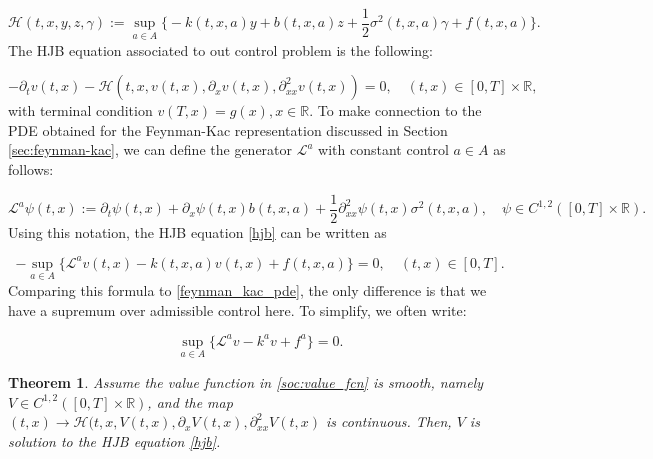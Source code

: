 \documentclass{article}
\newtheorem{theorem}{Theorem}
\begin{document}
\begin{equation}
\mathcal{H}(t,x,y,z,\gamma):=\sup_{a\in A}\Big\{-k(t,x,a)y+b(t,x,a)z+\frac{1}{2}\sigma^2(t,x,a)\gamma+f(t,x,a)\Big\}.
\end{equation}
The HJB equation associated to out control problem is the following:

\begin{equation} \label{hjb}
-\partial_tv(t,x)-\mathcal{H}(t,x,v(t,x),\partial_xv(t,x),\partial^2_{xx}v(t,x))=0, \quad (t,x)\in[0,T]\times\mathbb{R},
\end{equation}
with terminal condition $v(T,x)=g(x),x\in\mathbb{R}$. To make connection to the PDE obtained for the Feynman-Kac representation discussed in Section \ref{sec:feynman-kac}, we can define the generator $\mathcal{L}^a$ with constant control $a\in A$ as follows:

\begin{equation}
\mathcal{L}^a\psi(t,x):=\partial_t\psi(t,x)+\partial_x\psi(t,x)b(t,x,a)+\frac{1}{2}\partial^2_{xx}\psi(t,x)\sigma^2(t,x,a), \quad\psi\in C^{1,2}([0,T]\times\mathbb{R}).
\end{equation}
Using this notation, the HJB equation \eqref{hjb} can be written as 

\begin{equation}
-\sup_{a\in A}\{\mathcal{L}^av(t,x)-k(t,x,a)v(t,x)+f(t,x,a)\}=0, \quad (t,x)\in[0,T].
\end{equation}
Comparing this formula to \eqref{feynman_kac_pde}, the only difference is that we have a supremum over admissible control here. To simplify, we often write:

\begin{equation} \label{hjb_simple}
\sup_{a\in A}\{\mathcal{L}^av-k^av+f^a\}=0.
\end{equation}

\begin{theorem} \label{thm:soc_value_imply_hjb}
Assume the value function in \eqref{soc:value_fcn} is smooth, namely $V\in C^{1,2}([0,T]\times\mathbb{R})$, and the map $(t,x)\rightarrow\mathcal{H}(t,x,V(t,x),\partial_xV(t,x),\partial^2_{xx}V(t,x)$ is continuous. Then, $V$ is solution to the HJB equation \eqref{hjb}.
\end{theorem}
\end{document}
